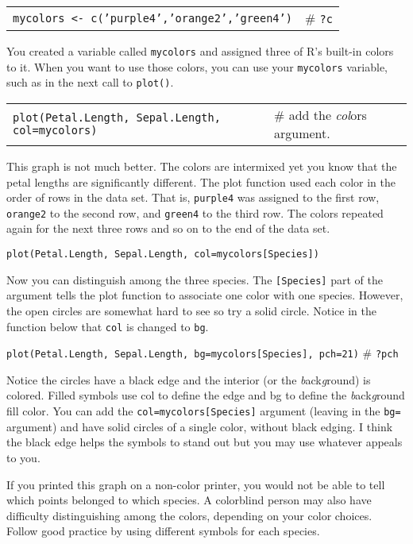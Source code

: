\documentclass[11pt]{article}
\begin{document}
\begin{tabular}{@{}L{3.5in}L{2in}@{}}
\texttt{mycolors \textless{}- c('purple4','orange2','green4')} & \# \texttt{?c} \\
\end{tabular}

You created a variable called \texttt{mycolors} and assigned three of R's
built-in colors to it. When you want to use those colors, you can use
your \texttt{mycolors} variable, such as in the next call to \texttt{plot()}.

\begin{tabular}{@{}L{3.75in}L{2in}@{}}
\texttt{plot(Petal.Length, Sepal.Length, col=mycolors)} & \# add the \emph{col}ors
argument.\\
\end{tabular}

This graph is not much better. The colors are intermixed yet you know
that the petal lengths are significantly different. The plot function
used each color in the order of rows in the data set. That is, \texttt{purple4}
was assigned to the first row, \texttt{orange2} to the second row, and \texttt{green4} to
the third row. The colors repeated again for the next three rows and so
on to the end of the data set.

\texttt{plot(Petal.Length, Sepal.Length, col=mycolors{[}Species{]})}

Now you can distinguish among the three species. The \texttt{{[}Species{]}} part
of the argument tells the plot function to associate one color with one
species. However, the open circles are somewhat hard to see so try a
solid circle. Notice in the function below that \texttt{col} is changed to \texttt{bg}.

\texttt{plot(Petal.Length, Sepal.Length, bg=mycolors{[}Species{]}, pch=21)} \#
\texttt{?pch}

Notice the circles have a black edge and the interior (or the
\emph{b}ack\emph{g}round) is colored. Filled symbols use col to define
the edge and bg to define the \emph{b}ack\emph{g}round fill color. You
can add the \texttt{col=mycolors{[}Species{]}} argument (leaving in the \texttt{bg=}
argument) and have solid circles of a single color, without black
edging. I think the black edge helps the symbols to stand out but you
may use whatever appeals to you.

If you printed this graph on a non-color printer, you would not be able
to tell which points belonged to which species. A colorblind person may
also have difficulty distinguishing among the colors, depending on your
color choices. Follow good practice by using different symbols for each
species. 
\end{document}
